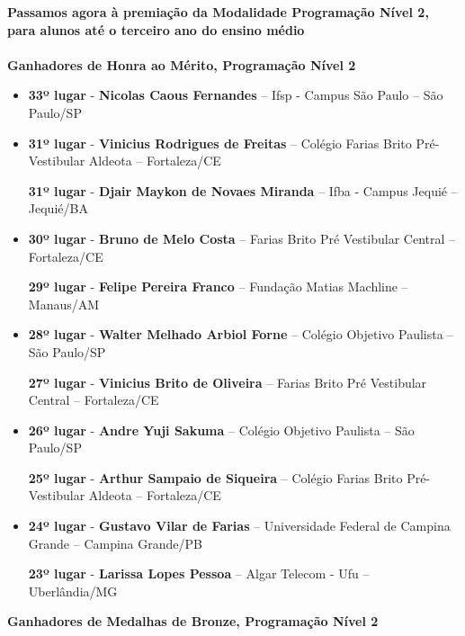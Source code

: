 \documentclass{article}
\begin{document}
\color{blue}
\textbf{Passamos agora à premiação da Modalidade Programação Nível 2, para alunos até o terceiro ano do ensino médio}\\\\
\textbf{\color{blue}Ganhadores de Honra ao Mérito, \color{black}Programação Nível 2}
\color{black}

\begin{itemize}
\item
\textbf{33º lugar} - \textbf{Nicolas Caous Fernandes} – Ifsp - Campus São Paulo – São Paulo/SP


\item
\textbf{31º lugar} - \textbf{Vinicius Rodrigues de Freitas} – Colégio Farias Brito Pré- Vestibular Aldeota – Fortaleza/CE


\textbf{31º lugar} - \textbf{Djair Maykon de Novaes Miranda} – Ifba - Campus Jequié – Jequié/BA



\item
\textbf{30º lugar} - \textbf{Bruno de Melo Costa} – Farias Brito Pré Vestibular Central – Fortaleza/CE


\textbf{29º lugar} - \textbf{Felipe Pereira Franco} – Fundação Matias Machline – Manaus/AM



\item
\textbf{28º lugar} - \textbf{Walter Melhado Arbiol Forne} – Colégio Objetivo Paulista – São Paulo/SP


\textbf{27º lugar} - \textbf{Vinicius Brito de Oliveira} – Farias Brito Pré Vestibular Central – Fortaleza/CE



\item
\textbf{26º lugar} - \textbf{Andre Yuji Sakuma} – Colégio Objetivo Paulista – São Paulo/SP


\textbf{25º lugar} - \textbf{Arthur Sampaio de Siqueira} – Colégio Farias Brito Pré- Vestibular Aldeota – Fortaleza/CE



\item
\textbf{24º lugar} - \textbf{Gustavo Vilar de Farias} – Universidade Federal de Campina Grande – Campina Grande/PB


\textbf{23º lugar} - \textbf{Larissa Lopes Pessoa} – Algar Telecom - Ufu – Uberlândia/MG



\end{itemize}

\textbf{\color{blue}Ganhadores de Medalhas de Bronze, \color{black}Programação Nível 2}
\color{black}
\end{document}
